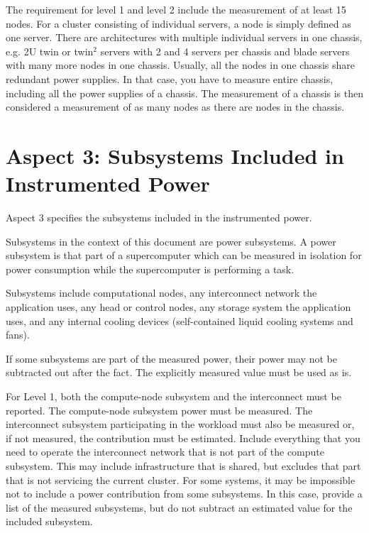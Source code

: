 \noindent
The requirement for level 1 and level 2 include the measurement of at least 15 nodes.
For a cluster consisting of individual servers, a node is simply defined as one server.
There are architectures with multiple individual servers in one chassis, e.g. 2U twin or twin$^2$ servers with 2 and 4 servers per chassis and blade servers with many more nodes in one chassis.
Usually, all the nodes in one chassis share redundant power supplies.
In that case, you have to measure entire chassis, including all the power supplies of a chassis.
The measurement of a chassis is then considered a measurement of as many nodes as there are nodes in the chassis.
\wl

\section{Aspect 3: Subsystems Included in Instrumented Power}
\label{sec:A3SIiIP}
\noindent
Aspect 3 specifies the subsystems included in the instrumented power. 
\wl

\noindent
Subsystems in the context of this document are power subsystems. A power subsystem is that part of a supercomputer which can be measured in isolation for power consumption while the supercomputer is performing a task. 
\wl

\noindent
Subsystems include computational nodes, any interconnect network the application uses, any head or control nodes, any storage system the application uses, and any internal cooling devices (self-contained liquid cooling systems and fans).
\wl

\noindent
If some subsystems are part of the measured power, their power may not be subtracted out after the fact.  The explicitly measured value must be used as is.
\wl


\noindent
For Level 1, both the compute-node subsystem and the interconnect must be reported.  
The compute-node subsystem power must be measured. 
The interconnect subsystem participating in the workload must also be measured or, if not measured, the contribution must be estimated.
Include everything that you need to operate the interconnect network that is not part of the compute subsystem. 
This may include infrastructure that is shared, but excludes that part that is not servicing the current cluster.
For some systems, it may be impossible not to include a power contribution from some subsystems. 
In this case, provide a list of the measured subsystems, but do not subtract an estimated value for the included subsystem. 
\wl

